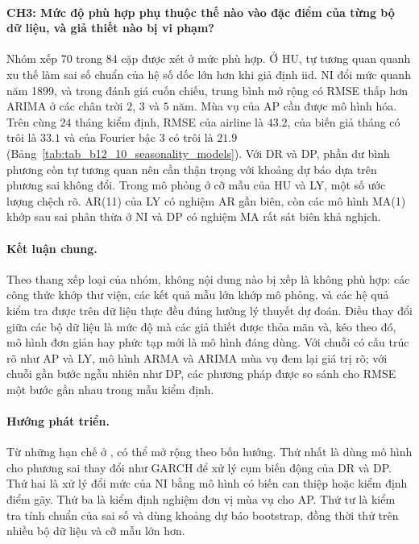 \paragraph{CH3: Mức độ phù hợp phụ thuộc thế nào vào đặc điểm của từng bộ dữ liệu, và giả thiết nào bị vi phạm?}
Nhóm xếp $70$ trong $84$ cặp được xét ở mức phù hợp. Ở HU, tự tương quan quanh xu thế làm sai số chuẩn của hệ số dốc lớn hơn khi giả định iid. NI đổi mức quanh năm 1899, và trong đánh giá cuốn chiếu, trung bình mở rộng có RMSE thấp hơn ARIMA ở các chân trời $2$, $3$ và $5$ năm. Mùa vụ của AP cần được mô hình hóa. Trên cùng $24$ tháng kiểm định, RMSE của airline là $43.2$, của biến giả tháng có trôi là $33.1$ và của Fourier bậc 3 có trôi là $21.9$ (Bảng~\ref{tab:tab_b12_10_seasonality_models}). Với DR và DP, phần dư bình phương còn tự tương quan nên cần thận trọng với khoảng dự báo dựa trên phương sai không đổi. Trong mô phỏng ở cỡ mẫu của HU và LY, một số ước lượng chệch rõ. AR(11) của LY có nghiệm AR gần biên, còn các mô hình MA(1) khớp sau sai phân thừa ở NI và DP có nghiệm MA rất sát biên khả nghịch.

\paragraph{Kết luận chung.}
Theo thang xếp loại của nhóm, không nội dung nào bị xếp là không phù hợp: các công thức khớp thư viện, các kết quả mẫu lớn khớp mô phỏng, và các hệ quả kiểm tra được trên dữ liệu thực đều đúng hướng lý thuyết dự đoán. Điều thay đổi giữa các bộ dữ liệu là mức độ mà các giả thiết được thỏa mãn và, kéo theo đó, mô hình đơn giản hay phức tạp mới là mô hình đáng dùng. Với chuỗi có cấu trúc rõ như AP và LY, mô hình ARMA và ARIMA mùa vụ đem lại giá trị rõ; với chuỗi gần bước ngẫu nhiên như DP, các phương pháp được so sánh cho RMSE một bước gần nhau trong mẫu kiểm định.

\paragraph{Hướng phát triển.}
Từ những hạn chế ở , có thể mở rộng theo bốn hướng. Thứ nhất là dùng mô hình cho phương sai thay đổi như GARCH để xử lý cụm biến động của DR và DP. Thứ hai là xử lý đổi mức của NI bằng mô hình có biến can thiệp hoặc kiểm định điểm gãy. Thứ ba là kiểm định nghiệm đơn vị mùa vụ cho AP. Thứ tư là kiểm tra tính chuẩn của sai số và dùng khoảng dự báo bootstrap, đồng thời thử trên nhiều bộ dữ liệu và cỡ mẫu lớn hơn.
\clearpage
{}
